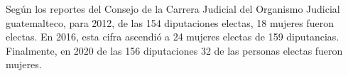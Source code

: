 Según los reportes del Consejo de la Carrera Judicial del Organismo Judicial guatemalteco, para 2012, de las 154 diputaciones electas, 18 mujeres fueron electas. En 2016, esta cifra ascendió a 24 mujeres electas de 159 diputancias. Finalmente, en 2020 de las 156 diputaciones 32 de las personas electas fueron mujeres. 